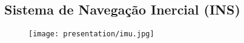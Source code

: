 %		
%

\subsection*{Sistema de Navegação Inercial (INS)}
\begin{frame}{}
	
	\begin{figure}[H]
		\texttt{[image: presentation/imu.jpg]}\footnotemark
	\end{figure}
	
\end{frame}


